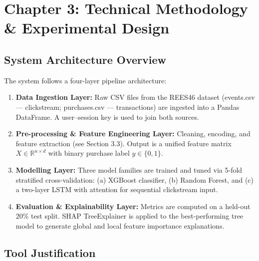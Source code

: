 \documentclass[12pt,a4paper]{article}
\begin{document}
\section{Chapter 3: Technical Methodology \& Experimental Design}

\subsection{System Architecture Overview}

The system follows a four-layer pipeline architecture:

\begin{enumerate}[leftmargin=1.4cm, itemsep=2pt]
  \item \textbf{Data Ingestion Layer:} Raw CSV files from the REES46 dataset
        (events.csv --- clickstream; purchases.csv --- transactions) are ingested into a
        Pandas DataFrame. A user--session key is used to join both sources.

  \item \textbf{Pre-processing \& Feature Engineering Layer:} Cleaning, encoding, and
        feature extraction (see Section 3.3). Output is a unified feature matrix $X \in
        \mathbb{R}^{n \times d}$ with binary purchase label $y \in \{0,1\}$.

  \item \textbf{Modelling Layer:} Three model families are trained and tuned via
        5-fold stratified cross-validation: (a) XGBoost classifier, (b) Random Forest,
        and (c) a two-layer LSTM with attention for sequential clickstream input.

  \item \textbf{Evaluation \& Explainability Layer:} Metrics are computed on a
        held-out 20\% test split. SHAP TreeExplainer is applied to the best-performing
        tree model to generate global and local feature importance explanations.
\end{enumerate}

\subsection{Tool Justification}
\end{document}
